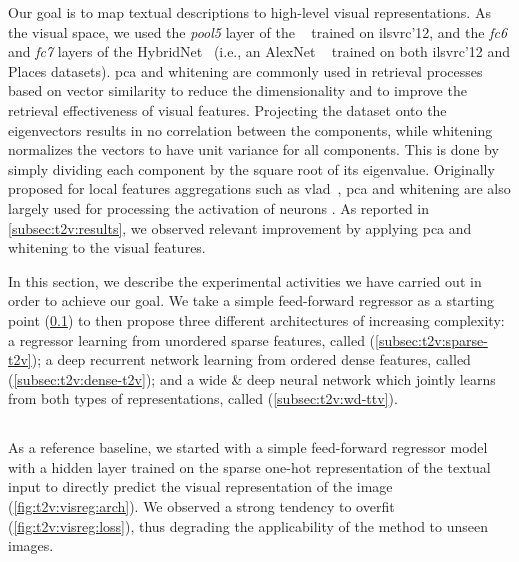 Our goal is to map textual descriptions to high-level visual representations.
As the visual space, we used the \emph{pool5} layer of the \resnet{} ~\cite{he2016deep} trained on \gls{ilsvrc}'12, and the \emph{fc6} and \emph{fc7} layers of the HybridNet~\cite{zhou2014learning} (i.e., an AlexNet ~\cite{krizhevsky2012imagenet} trained on both \gls{ilsvrc}'12 and Places datasets).
\acrfull{pca} and whitening are commonly used in retrieval processes based on vector similarity to reduce the dimensionality and to improve the retrieval effectiveness of visual features.
Projecting the dataset onto the eigenvectors results in no correlation between the components, while
whitening normalizes the vectors to have unit variance for all components.
This is done by simply dividing each component by the square root of its eigenvalue.
Originally proposed for local features aggregations such as \gls{vlad}~\cite{jegou2012negative}, \gls{pca} and whitening are also largely used for processing the activation of neurons \cite{sharif2014cnn,gong2014multi,gordo2016deep}.
As reported in \ref{subsec:t2v:results}, we observed relevant improvement by applying \gls{pca} and whitening to the visual features.

In this section, we describe the experimental activities we have carried out in order to achieve our goal.
We take a simple feed-forward regressor as a starting point (\ref{subsec:t2v:vis-reg}) to then propose three different architectures of increasing complexity: a regressor learning from unordered sparse features, called \sparsettv{} (\ref{subsec:t2v:sparse-t2v}); a deep recurrent network learning from ordered dense features, called \densettv{} (\ref{subsec:t2v:dense-t2v}); and a wide \& deep neural network which jointly learns from both types of representations, called \widedeepttv{} (\ref{subsec:t2v:wd-ttv}).


\subsection{\visreg{}}
\label{subsec:t2v:vis-reg}

As a reference baseline, we started with a simple feed-forward regressor model with a hidden layer trained on the sparse one-hot representation of the textual input to directly predict the visual representation of the image (\ref{fig:t2v:visreg:arch}).
We observed a strong tendency to overfit (\ref{fig:t2v:visreg:loss}), thus degrading the applicability of the method to unseen images.

